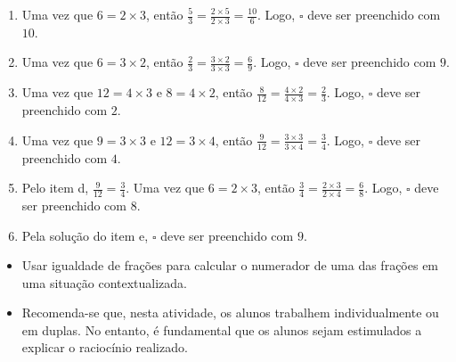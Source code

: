 \begin{multicols}{2}
\begin{solucao}{}{}
\begin{enumerate} [\quad a)] %
    \item       Uma vez que       $6 = 2 \times 3$, então       $\frac{5}{3} =
\frac{2 \times 5}{2 \times 3} = \frac{10}{6}$. Logo,       $\square$       deve
ser preenchido com       $10$.
    \item       Uma vez que       $6 = 3 \times 2$, então       $\frac{2}{3} =
\frac{3 \times 2}{3 \times 3} = \frac{6}{9}$. Logo,       $\square$       deve
ser preenchido com       $9$.
    \item       Uma vez que       $12 = 4 \times 3$       e       $8 = 4 \times
2$, então       $\frac{8}{12} = \frac{4 \times 2}{4 \times 3} = \frac{2}{3}$.
Logo,       $\square$       deve ser preenchido com       $2$.
    \item       Uma vez que       $9 = 3 \times 3$       e       $12 = 3 \times
4$, então       $\frac{9}{12} = \frac{3 \times 3}{3 \times 4} = \frac{3}{4}$.
Logo,       $\square$       deve ser preenchido com       $4$.
    \item       Pelo item d,       $\frac{9}{12} = \frac{3}{4}$. Uma vez que
  $6 = 2 \times 3$, então       $\frac{3}{4} = \frac{2 \times 3}{2 \times 4} =
\frac{6}{8}$. Logo,       $\square$       deve ser preenchido com       $8$.
    \item       Pela solução do item e,       $\square$       deve ser
preenchido com       $9$.
\end{enumerate} %

\end{solucao}



\begin{objetivos}[label=chap4-ativ11]{}{}
\begin{itemize} %
    \item       Usar igualdade de frações para calcular o numerador de uma das
frações em uma situação contextualizada.
\end{itemize} %

\end{objetivos}

\begin{orientacoes}{}{}

\begin{itemize} %
    \item       Recomenda-se que, nesta atividade, os alunos trabalhem
individualmente ou em duplas. No entanto, é fundamental que os alunos sejam
estimulados a explicar o raciocínio realizado.
\end{itemize} %


\end{orientacoes}
\end{multicols}

